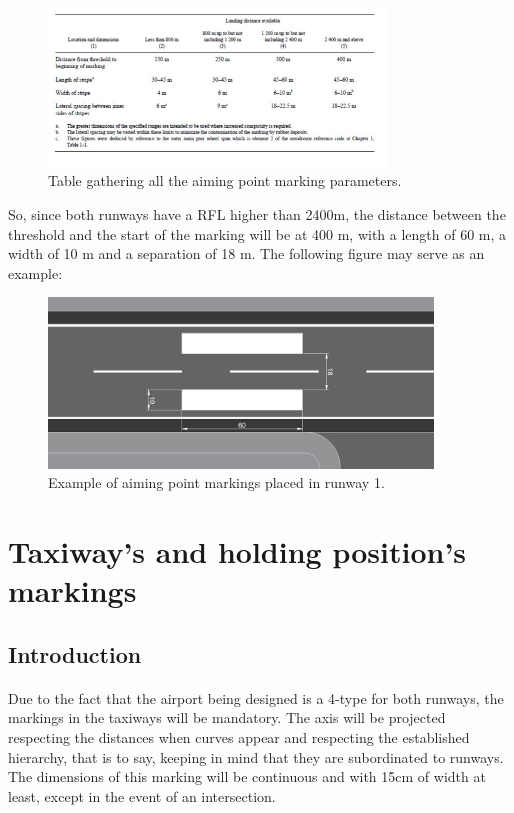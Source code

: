 		\begin{figure}[H]
			\centering
			\includegraphics[clip, trim=0cm 0cm 0cm 0cm, 	width=0.8\textwidth]{./images/markings/aimpointtable}
			\caption{Table gathering all the aiming point marking parameters.} %
			\label{} %
		\end{figure}
		
		So, since both runways have a RFL higher than 2400m, the distance between the threshold and the start of the marking will be at 400 m, with a length of 60 m, a width of 10 m and a separation of 18 m. The following figure may serve as an example:
		
		\begin{figure}[H]
			\centering
			\includegraphics[clip, trim=0cm 0cm 0cm 0cm, 	width=0.911\textwidth]{./images/markings/aimpoint}
			\caption{Example of aiming point markings placed in runway 1.} %
			\label{} %
		\end{figure}
		
	\section{Taxiway's and holding position's markings}
		\subsection{Introduction}
		\paragraph{}Due to the fact that the airport being designed is a 4-type for both runways, the markings in the taxiways will be mandatory. The axis will be projected respecting the distances when curves appear and respecting the established hierarchy, that is to say, keeping in mind that they are subordinated to runways. The dimensions of this marking will be continuous and with 15cm of width at least, except in the event of an intersection.
		
